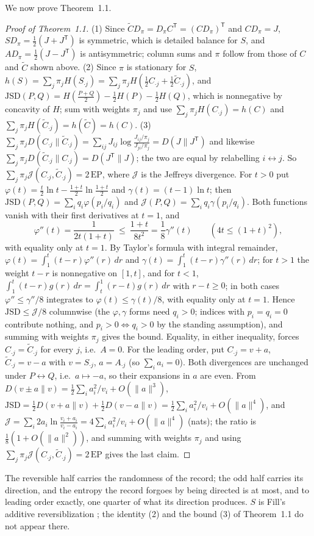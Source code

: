 \documentclass[11pt]{article}
\theoremstyle{definition}\newtheorem{definition}[theorem]{Definition}
\theoremstyle{remark}\newtheorem{remark}[theorem]{Remark}
\begin{document}
We now prove Theorem~1.1.
\begin{proof}[Proof of Theorem~1.1]
(1) Since $\tilde CD_\pi=D_\pi C^{\mathsf T}=(CD_\pi)^{\mathsf T}$ and $CD_\pi=J$, $SD_\pi=\frac12(J+J^{\mathsf T})$ is symmetric, which is detailed balance for $S$, and $AD_\pi=\frac12(J-J^{\mathsf T})$ is antisymmetric; column sums and $\pi$ follow from those of $C$ and $\tilde C$ shown above. (2) Since $\pi$ is stationary for $S$, $h(S)=\sum_j\pi_jH(S_{\cdot j})=\sum_j\pi_jH(\frac12C_{\cdot j}+\frac12\tilde C_{\cdot j})$, and $\mathrm{JSD}(P,Q)=H(\frac{P+Q}2)-\frac12H(P)-\frac12H(Q)$, which is nonnegative by concavity of $H$; sum with weights $\pi_j$ and use $\sum_j\pi_jH(C_{\cdot j})=h(C)$ and $\sum_j\pi_jH(\tilde C_{\cdot j})=h(\tilde C)=h(C)$. (3) $\sum_j\pi_jD(C_{\cdot j}\|\tilde C_{\cdot j})=\sum_{ij}J_{ij}\log\frac{J_{ij}/\pi_j}{J_{ji}/\pi_j}=D(J\|J^{\mathsf T})$ and likewise $\sum_j\pi_jD(\tilde C_{\cdot j}\|C_{\cdot j})=D(J^{\mathsf T}\|J)$; the two are equal by relabelling $i\leftrightarrow j$. So $\sum_j\pi_j\mathcal J(C_{\cdot j},\tilde C_{\cdot j})=2\,\mathrm{EP}$, where $\mathcal J$ is the Jeffreys divergence. For $t>0$ put $\varphi(t)=\frac t2\ln t-\frac{1+t}2\ln\frac{1+t}2$ and $\gamma(t)=(t-1)\ln t$; then $\mathrm{JSD}(P,Q)=\sum_iq_i\varphi(p_i/q_i)$ and $\mathcal J(P,Q)=\sum_iq_i\gamma(p_i/q_i)$. Both functions vanish with their first derivatives at $t=1$, and
\[
\varphi''(t)=\frac1{2t(1+t)}\ \le\ \frac{1+t}{8t^2}=\frac18\gamma''(t)\qquad(4t\le(1+t)^2),
\]
with equality only at $t=1$. By Taylor's formula with integral remainder, $\varphi(t)=\int_1^t(t-r)\varphi''(r)\,dr$ and $\gamma(t)=\int_1^t(t-r)\gamma''(r)\,dr$; for $t>1$ the weight $t-r$ is nonnegative on $[1,t]$, and for $t<1$, $\int_1^t(t-r)g(r)\,dr=\int_t^1(r-t)g(r)\,dr$ with $r-t\ge0$; in both cases $\varphi''\le\gamma''/8$ integrates to $\varphi(t)\le\gamma(t)/8$, with equality only at $t=1$. Hence $\mathrm{JSD}\le\mathcal J/8$ columnwise (the $\varphi,\gamma$ forms need $q_i>0$; indices with $p_i=q_i=0$ contribute nothing, and $p_i>0\iff q_i>0$ by the standing assumption), and summing with weights $\pi_j$ gives the bound. Equality, in either inequality, forces $C_{\cdot j}=\tilde C_{\cdot j}$ for every $j$, i.e.\ $A=0$. For the leading order, put $C_{\cdot j}=v+a$, $\tilde C_{\cdot j}=v-a$ with $v=S_{\cdot j}$, $a=A_{\cdot j}$ (so $\sum_ia_i=0$). Both divergences are unchanged under $P\leftrightarrow Q$, i.e.\ $a\mapsto-a$, so their expansions in $a$ are even. From $D(v\pm a\|v)=\frac12\sum_ia_i^2/v_i+O(\|a\|^3)$, $\mathrm{JSD}=\frac12D(v+a\|v)+\frac12D(v-a\|v)=\frac12\sum_ia_i^2/v_i+O(\|a\|^4)$, and $\mathcal J=\sum_i2a_i\ln\frac{v_i+a_i}{v_i-a_i}=4\sum_ia_i^2/v_i+O(\|a\|^4)$ (nats); the ratio is $\frac18(1+O(\|a\|^2))$, and summing with weights $\pi_j$ and using $\sum_j\pi_j\mathcal J(C_{\cdot j},\tilde C_{\cdot j})=2\,\mathrm{EP}$ gives the last claim.
\end{proof}
The reversible half carries the randomness of the record; the odd half carries its direction, and the entropy the record forgoes by being directed is at most, and to leading order exactly, one quarter of what its direction produces. $S$ is Fill's additive reversiblization \cite{Fill}; the identity (2) and the bound (3) of Theorem~1.1 do not appear there.
\end{document}
